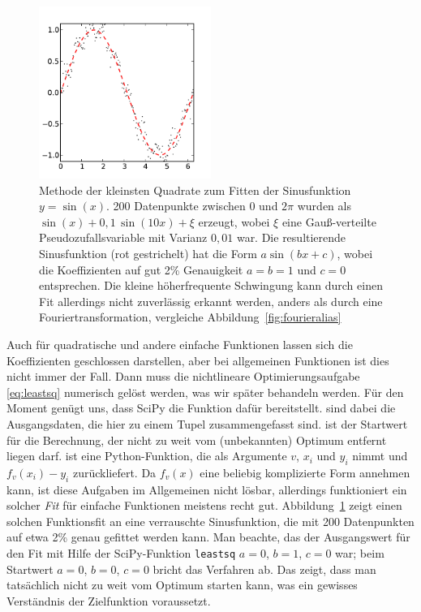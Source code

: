 \begin{figure}
  \centering
  \includegraphics[width=0.5\textwidth]{plots/leastsq}
  \caption{Methode der kleinsten Quadrate zum Fitten der Sinusfunktion
    $y=\sin(x)$. 200 Datenpunkte zwischen 0 und $2\pi$ wurden als
    $\sin(x) + 0,1\,\sin(10 x) + \xi$ erzeugt, wobei $\xi$ eine
    Gauß-verteilte Pseudozufallsvariable mit Varianz $0,01$ war. Die
    resultierende Sinusfunktion (rot gestrichelt) hat die Form $a
    \sin(bx+c)$, wobei die Koeffizienten auf gut 2\% Genauigkeit
    $a=b=1$ und $c=0$ entsprechen. Die kleine höherfrequente
    Schwingung kann durch einen Fit allerdings nicht zuverlässig
    erkannt werden, anders als durch eine Fouriertransformation,
    vergleiche Abbildung~\ref{fig:fourieralias}}
  \label{fig:leastsq}
\end{figure}

Auch für quadratische und andere einfache Funktionen lassen sich die
Koeffizienten geschlossen darstellen, aber bei allgemeinen Funktionen
ist dies nicht immer der Fall. Dann muss die nichtlineare
Optimierungsaufgabe \eqref{eq:leastsq} numerisch gelöst werden, was
wir später behandeln werden. Für den Moment genügt uns, dass SciPy die
Funktion  dafür
bereitstellt.  sind dabei die Ausgangsdaten, die hier zu
einem Tupel zusammengefasst sind.  ist der Startwert für die
Berechnung, der nicht zu weit vom (unbekannten) Optimum entfernt
liegen darf.  ist eine Python-Funktion, die als Argumente
$v$, $x_i$ und $y_i$ nimmt und $f_v(x_i) - y_i$ zurückliefert.  Da
$f_v(x)$ eine beliebig komplizierte Form annehmen kann, ist diese
Aufgaben im Allgemeinen nicht lösbar, allerdings funktioniert ein
solcher \emph{Fit} für einfache Funktionen meistens recht
gut. Abbildung~\ref{fig:leastsq} zeigt einen solchen Funktionsfit an
eine verrauschte Sinusfunktion, die mit 200 Datenpunkten auf etwa 2\%
genau gefittet werden kann. Man beachte, das der Ausgangswert für den
Fit mit Hilfe der SciPy-Funktion \lstinline!leastsq! $a=0$, $b=1$,
$c=0$ war; beim Startwert $a=0$, $b=0$, $c=0$ bricht das Verfahren
ab. Das zeigt, dass man tatsächlich nicht zu weit vom Optimum starten
kann, was ein gewisses Verständnis der Zielfunktion voraussetzt.

